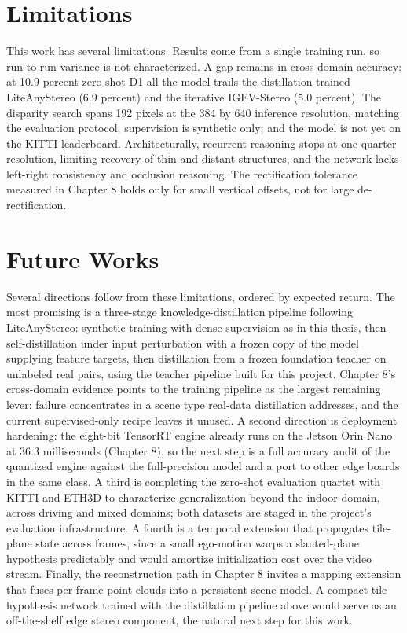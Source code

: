 \FloatBarrier
\section{Limitations}
This work has several limitations. Results come from a single training
run, so run-to-run variance is not characterized. A gap remains in
cross-domain accuracy: at 10.9 percent zero-shot D1-all the model trails
the distillation-trained LiteAnyStereo (6.9 percent) and the iterative
IGEV-Stereo (5.0 percent). The disparity search spans 192 pixels at the 384 by
640 inference resolution, matching the evaluation protocol; supervision
is synthetic only; and the model is not yet on the KITTI leaderboard. Architecturally, recurrent reasoning
stops at one quarter resolution, limiting recovery of thin and distant
structures, and the network lacks left-right consistency and occlusion
reasoning. The rectification tolerance measured in Chapter 8 holds only
for small vertical offsets, not for large de-rectification.

\FloatBarrier
\section{Future Works}
Several directions follow from these limitations, ordered by expected
return. The most promising is a three-stage knowledge-distillation
pipeline following LiteAnyStereo: synthetic training with dense
supervision as in this thesis, then self-distillation under input
perturbation with a frozen copy of the model supplying feature targets,
then distillation from a frozen foundation teacher on unlabeled real
pairs, using the teacher pipeline built for this project. Chapter 8's
cross-domain evidence points to the training pipeline as the largest
remaining lever: failure concentrates in a scene type real-data
distillation addresses, and the current supervised-only recipe leaves
it unused. A second direction is deployment hardening: the eight-bit
TensorRT engine already runs on the Jetson Orin Nano at 36.3 milliseconds
(Chapter 8), so the next step is a full accuracy audit of the quantized
engine against the full-precision model and a port to other edge boards
in the same class. A third is completing the zero-shot evaluation quartet with
KITTI and ETH3D to characterize generalization beyond the indoor domain,
across driving and mixed domains; both datasets are staged in the
project's evaluation infrastructure. A fourth is a temporal
extension that propagates tile-plane state across frames, since a
small ego-motion warps a slanted-plane hypothesis predictably and would
amortize initialization cost over the video stream. Finally, the
reconstruction path in Chapter 8 invites a mapping extension that fuses
per-frame point clouds into a persistent scene model. A compact
tile-hypothesis network trained with the distillation pipeline above
would serve as an off-the-shelf edge stereo component, the natural next
step for this work.
